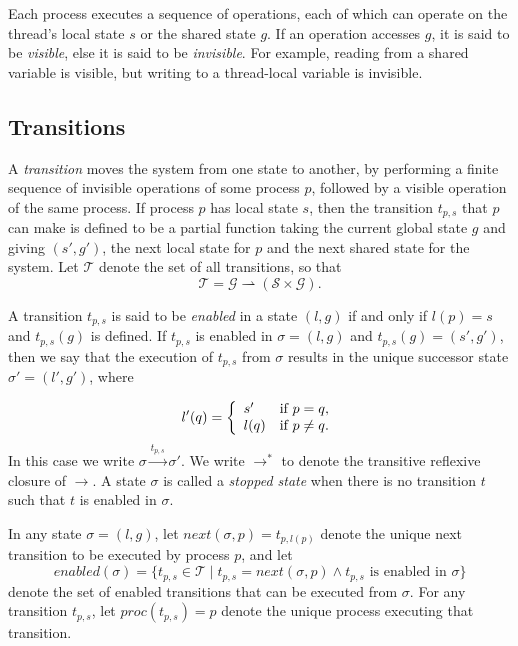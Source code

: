 \documentclass[12pt,a4paper,twoside,openright]{report}
\begin{document}
Each process executes a sequence of operations, each of which can
operate on the thread's local state $s$ or the shared
state $g$. If an operation
accesses $g$, it is said to be \emph{visible}, else it is said to be
\emph{invisible}. For example, reading from a shared variable is
visible, but writing to a thread-local variable is invisible.

\subsection{Transitions}
A \emph{transition} moves the system from one state to another,
by performing a finite sequence of invisible operations of some
process $p$, followed by a visible operation of the same process.
If process $p$ has local state $s$, then the transition $t_{p,s}$
that $p$ can make is defined to be a partial function taking the current
global state $g$ and giving $(s', g')$, the next local state for $p$
and the next shared state for the system. Let $\mathcal{T}$ denote the
set of all transitions, so that
	\[\mathcal{T} = \mathcal{G} \rightharpoonup
				(\mathcal{S} \times \mathcal{G}).\]

A transition $t_{p,s}$ is said to be \emph{enabled} in a state
$(l, g)$ if and only if $l(p) = s$ and $t_{p,s}(g)$ is defined.
If $t_{p,s}$ is enabled in $\sigma = (l, g)$ and 
$t_{p,s}(g) = (s', g')$, then we say that the
execution of $t_{p,s}$ from $\sigma$ results in the unique successor
state $\sigma' = (l', g')$, where

\[
	l'(q) = \left\{\begin{array}{lr}
				s' & \textmd{if } p = q, \\
				l(q) &\textmd{if } p \neq q.
			\end{array} \right.
\]
In this case we write $\sigma \xrightarrow{t_{p,s}} \sigma'$.
We write $\longrightarrow^*$ to denote the transitive reflexive
closure of $\longrightarrow$.
A state $\sigma$ is called a \emph{stopped state} when there is no transition
$t$ such that $t$ is enabled in $\sigma$.

In any state $\sigma = (l, g)$, let
$\textit{next}(\sigma, p) = t_{p,l(p)}$ denote the unique next transition
to be executed by process $p$, and let
\[
	\textit{enabled}(\sigma) = \{t_{p,s} \in \mathcal{T} \mid
	t_{p,s} = \textit{next}(\sigma, p)
	\wedge t_{p,s} \text{ is enabled in } \sigma\}
\]
denote the set of enabled transitions that can be executed from $\sigma$.
For any transition $t_{p,s}$, let $\textit{proc}(t_{p,s}) = p$
denote the unique process executing that transition.
\end{document}
